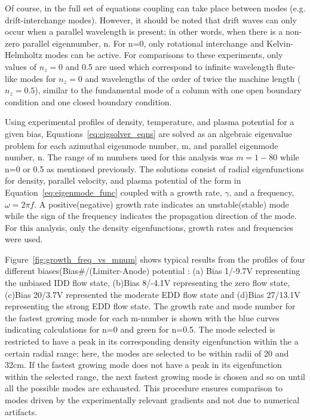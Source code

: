 \documentclass[aip,pop,amsmath,amssymb,reprint,superscriptaddress]{revtex4-1} %
\begin{document}
Of course, in the full set of equations coupling can take place between modes (e.g. drift-interchange modes). However, it should be noted that drift waves can only occur when a parallel wavelength is present; in other words, when there is a non-zero parallel eigennumber, n. For n=0, only rotational interchange and Kelvin-Helmholtz modes can be active. For comparisons to these experiments, only values of $n_{z} = $0 and 0.5 are used which correspond to infinite wavelength flute-like modes for $n_{z} = 0$ and wavelengths of the order of twice the machine length ($n_{z} = 0.5$), similar to the fundamental mode of a column with one open boundary condition and one closed boundary condition.

Using experimental profiles of density, temperature, and plasma potential for a given bias, Equations~\ref{eq:eigsolver_eqns} are solved as an algebraic eigenvalue problem for each azimuthal eigenmode number, m, and parallel eigenmode number, n. The range of m numbers used for this analysis was $m=1-80$ while n=0 or 0.5 as mentioned previously. The solutions consist of radial eigenfunctions for density, parallel velocity, and plasma potential of the form in Equation~\ref{eq:eigenmode_func} coupled with a growth rate, $\gamma$, and a frequency, $\omega = 2\pi f$. A positive(negative) growth rate indicates an unstable(stable) mode while the sign of the frequency indicates the propagation direction of the mode. For this analysis, only the density eigenfunctions, growth rates and frequencies were used.

Figure~\ref{fig:growth_freq_vs_mnum} shows typical results from the profiles of four different biases(Bias\#/(Limiter-Anode) potential : (a) Bias 1/-9.7V representing the unbiased IDD flow state, (b)Bias 8/-4.1V representing the zero flow state, (c)Bias 20/3.7V represented the moderate EDD flow state and (d)Bias 27/13.1V representing the strong EDD flow state. The growth rate and mode number for the fastest growing mode for each m-number is shown with the blue curves indicating calculations for n=0 and green for n=0.5. The mode selected is restricted to have a peak in its corresponding density eigenfunction within the a certain radial range; here, the modes are selected to be within radii of 20 and 32cm. If the fastest growing mode does not have a peak in its eigenfunction within the selected range, the next fastest growing mode is chosen and so on until all the possible modes are exhausted. This procedure ensures comparison to modes driven by the experimentally relevant gradients and not due to numerical artifacts.
\end{document}
